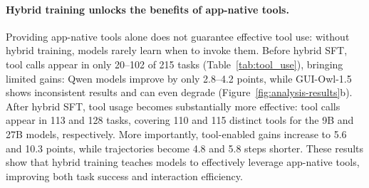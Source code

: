 \paragraph{Hybrid training unlocks the benefits of app-native tools.}
Providing app-native tools alone does not guarantee effective tool use: without hybrid training, models rarely learn when to invoke them.
Before hybrid SFT, tool calls appear in only 20--102 of 215 tasks (Table~\ref{tab:tool_use}), bringing limited gains: Qwen models improve by only 2.8--4.2 points, while GUI-Owl-1.5 shows inconsistent results and can even degrade (Figure~\ref{fig:analysis-results}b).
After hybrid SFT, tool usage becomes substantially more effective: tool calls appear in 113 and 128 tasks, covering 110 and 115 distinct tools for the 9B and 27B models, respectively. More importantly, tool-enabled gains increase to 5.6 and 10.3 points, while trajectories become 4.8 and 5.8 steps shorter. These results show that hybrid training teaches models to effectively leverage app-native tools, improving both task success and interaction efficiency.
